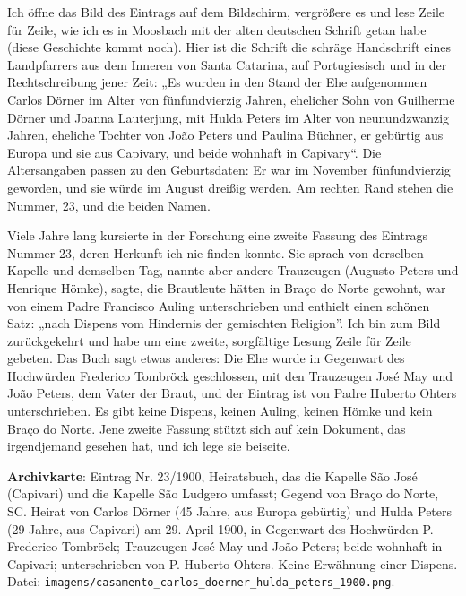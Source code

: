 \documentclass[
  ngerman,
  11pt,
  openany]{book}
\begin{document}
Ich öffne das Bild des Eintrags auf dem Bildschirm, vergrößere es und
lese Zeile für Zeile, wie ich es in Moosbach mit der alten deutschen
Schrift getan habe (diese Geschichte kommt noch). Hier ist die Schrift
die schräge Handschrift eines Landpfarrers aus dem Inneren von Santa
Catarina, auf Portugiesisch und in der Rechtschreibung jener Zeit: „Es
wurden in den Stand der Ehe aufgenommen Carlos Dörner im Alter von
fünfundvierzig Jahren, ehelicher Sohn von Guilherme Dörner und Joanna
Lauterjung, mit Hulda Peters im Alter von neunundzwanzig Jahren,
eheliche Tochter von João Peters und Paulina Büchner, er gebürtig aus
Europa und sie aus Capivary, und beide wohnhaft in Capivary``. Die
Altersangaben passen zu den Geburtsdaten: Er war im November
fünfundvierzig geworden, und sie würde im August dreißig werden. Am
rechten Rand stehen die Nummer, 23, und die beiden Namen.

Viele Jahre lang kursierte in der Forschung eine zweite Fassung des
Eintrags Nummer 23, deren Herkunft ich nie finden konnte. Sie sprach von
derselben Kapelle und demselben Tag, nannte aber andere Trauzeugen
(Augusto Peters und Henrique Hömke), sagte, die Brautleute hätten in
Braço do Norte gewohnt, war von einem Padre Francisco Auling
unterschrieben und enthielt einen schönen Satz: „nach Dispens vom
Hindernis der gemischten Religion''. Ich bin zum Bild zurückgekehrt und
habe um eine zweite, sorgfältige Lesung Zeile für Zeile gebeten. Das
Buch sagt etwas anderes: Die Ehe wurde in Gegenwart des Hochwürden
Frederico Tombröck geschlossen, mit den Trauzeugen José May und João
Peters, dem Vater der Braut, und der Eintrag ist von Padre Huberto
Ohters unterschrieben. Es gibt keine Dispens, keinen Auling, keinen
Hömke und kein Braço do Norte. Jene zweite Fassung stützt sich auf kein
Dokument, das irgendjemand gesehen hat, und ich lege sie beiseite.

\begin{ficha}

\textbf{Archivkarte}: Eintrag Nr. 23/1900, Heiratsbuch, das die Kapelle
São José (Capivari) und die Kapelle São Ludgero umfasst; Gegend von
Braço do Norte, SC. Heirat von Carlos Dörner (45 Jahre, aus Europa
gebürtig) und Hulda Peters (29 Jahre, aus Capivari) am 29. April 1900,
in Gegenwart des Hochwürden P. Frederico Tombröck; Trauzeugen José May
und João Peters; beide wohnhaft in Capivari; unterschrieben von P.
Huberto Ohters. Keine Erwähnung einer Dispens. Datei:
\texttt{imagens/casamento\_carlos\_doerner\_hulda\_peters\_1900.png}.

\end{ficha}
\end{document}
